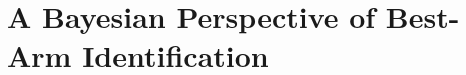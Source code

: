 
\chapter{A Bayesian Perspective of Best-Arm Identification}\label{chap:t3c}
	\minitoc
	\newpage



















% 
% 
